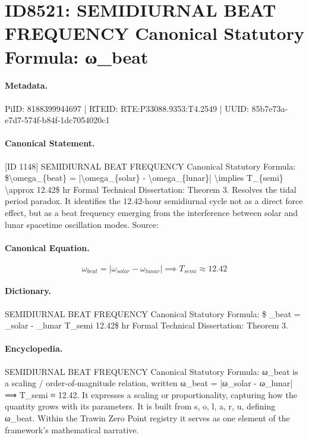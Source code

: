 \section*{ID8521: SEMIDIURNAL BEAT FREQUENCY Canonical Statutory Formula: ω\_beat}
\paragraph{Metadata.}
PiID: 8188399944697 | RTEID: RTE:P33088.9353:T4.2549 | UUID: 85b7e73a-e7d7-574f-b84f-1dc7054020c1

\paragraph{Canonical Statement.}
[ID 1148] SEMIDIURNAL BEAT FREQUENCY Canonical Statutory Formula: \$\textbackslash{}omega\_\{beat\} = |\textbackslash{}omega\_\{solar\} - \textbackslash{}omega\_\{lunar\}| \textbackslash{}implies T\_\{semi\} \textbackslash{}approx 12.42\$ hr Formal Technical Dissertation: Theorem 3. Resolves the tidal period paradox. It identifies the 12.42-hour semidiurnal cycle not as a direct force effect, but as a beat frequency emerging from the interference between solar and lunar spacetime oscillation modes. Source:

\paragraph{Canonical Equation.}
\[
\omega_{beat} = |\omega_{solar} - \omega_{lunar}| \implies T_{semi} \approx 12.42
\]

\paragraph{Dictionary.}
SEMIDIURNAL BEAT FREQUENCY Canonical Statutory Formula: \$ \_beat = \_solar - \_lunar T\_semi 12.42\$ hr Formal Technical Dissertation: Theorem 3.

\paragraph{Encyclopedia.}
SEMIDIURNAL BEAT FREQUENCY Canonical Statutory Formula: ω\_beat is a scaling / order-of-magnitude relation, written ω\_beat = |ω\_solar - ω\_lunar| ⟹ T\_semi ≈ 12.42. It expresses a scaling or proportionality, capturing how the quantity grows with its parameters. It is built from s, o, l, a, r, u, defining ω\_beat. Within the Trawin Zero Point registry it serves as one element of the framework's mathematical narrative.
